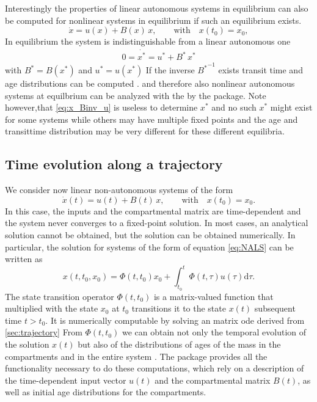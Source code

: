Interestingly the properties of linear autonomous systems in equilibrium can
also be computed for nonlinear systems in equilibrium if such an equilibrium
exists.
\begin{equation} \label{eq:NLS}
\dot{x} = u(x) + B(x) \, x, \qquad  \mathrm{with} \quad x(t_0) = x_0,
\end{equation}
In equilibrium the system is indistinguishable from a linear autonomous one
\begin{align} 
  0= \dot{x^*} = u^* + B^* \, x^*
\end{align}
with $B^*=B(x^*)$ and $u^*=u(x^*)$ 
If the inverse ${B^*}^{-1}$ exists transit time and age distributions can be computed 
\citep{Metzler2018MGS}.
and therefore also  nonlinear autonomous
systems at equilbrium can be analyzed with the by the
\LAPM package.
Note however,that 
\eqref{eq:x_Binv_u} is useless to determine $x^*$ and 
no such $x^*$ might exist for some systems
while others may have multiple fixed points and the age and
transittime distribution may be very different for these different equilibria.

\subsection{Time evolution along a trajectory} \label{sec:trajectory}
We consider now linear non-autonomous systems of the form
\begin{equation} \label{eq:NALS}
\dot{x}(t) = u(t) + B(t) \, x, \qquad  \mathrm{with} \quad x(t_0) = x_0.
\end{equation}
In this case, the inputs and the compartmental matrix are time-dependent and
the system never converges to a fixed-point solution. In most cases, an
analytical solution cannot be obtained, but the solution can be 
obtained numerically. In particular, the solution for systems of the form of equation \eqref{eq:NALS} can be written as
\begin{equation}
x(t, t_0, x_0) = \Phi(t, t_0) x_0 + \int_{t_0}^{t} \Phi(t, \tau) u(\tau) \mathrm{d}\tau.
\end{equation}
The state transition operator $\Phi(t,t_0)$ is a matrix-valued function that
multiplied with the state $x_0$ at $t_0$ transitions it to the state $x(t)$
subsequent time $t > t_0$. It is numerically computable by solving an matrix
ode derived from \eqref{sec:trajectory} 
From $\Phi(t,t_0)$ we can obtain not only the temporal evolution of the
solution $x(t)$ but also of the distributions of ages of the mass in the compartments and in the entire system \citep{Metzler2018PNAS}.
The \CompartmentalSystems package provides all the functionality necessary to do these computations, which rely on a description of the time-dependent input vector $u(t)$ and the compartmental matrix $B(t)$, as well as initial age distributions for the compartments.

